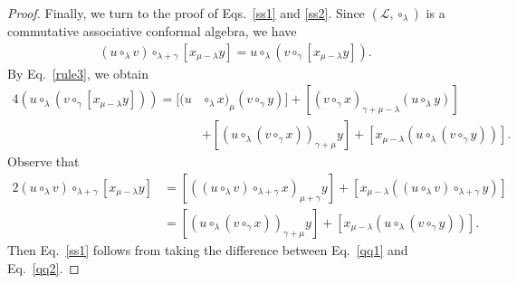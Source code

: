 \documentclass[10pt,a4paper]{amsart}
\begin{document}
\begin{proof}
Finally, we turn to the proof of Eqs.~\eqref{ss1} and \eqref{ss2}. Since $(\mathcal{L} ,\circ_\lambda)$ is a {commutative associative conformal algebra}, we have
   \begin{align*}
        \left(u\circ_{\lambda}v\right)\circ_{\lambda+\gamma}[x_{\mu-\lambda}y]=u\circ_{\lambda}\left(v\circ_{\gamma}[x_{\mu-\lambda}y]\right).
   \end{align*}
By Eq.~\eqref{rule3}, we obtain
   \begin{align}\label{qq1}
      {4}(u\circ_{\lambda}\left(v\circ_{\gamma}[x_{\mu-\lambda}y]\right))=[(u&\circ_{\lambda}x)_{\mu}(v\circ_{\gamma}y)]+[(v\circ_{\gamma}x)_{\gamma+\mu-\lambda}(u\circ_{\lambda}y)] \nonumber\\
      &+[(u\circ_{\lambda}(v\circ_{\gamma}x))_{\gamma+\mu}y]+[x_{\mu-\lambda}(u\circ_{\lambda}(v\circ_{\gamma}y))].
   \end{align}
Observe that
   \begin{align}\label{qq2}
      {2}\left(u\circ_{\lambda}v\right)\circ_{\lambda+\gamma}[x_{\mu-\lambda}y]&=[((u\circ_{\lambda}v)\circ_{\lambda+\gamma}x)_{\mu+\gamma}y]+[x_{\mu-\lambda}((u\circ_{\lambda}v)\circ_{\lambda+\gamma}y)] \nonumber\\
      &=[(u\circ_{\lambda}(v\circ_{\gamma}x))_{\gamma+\mu}y]+[x_{\mu-\lambda}(u\circ_{\lambda}(v\circ_{\gamma}y))].
   \end{align}
Then Eq.~\eqref{ss1} follows from taking the difference between Eq.~\eqref{qq1} and Eq.~\eqref{qq2}.


\end{proof}
\end{document}
